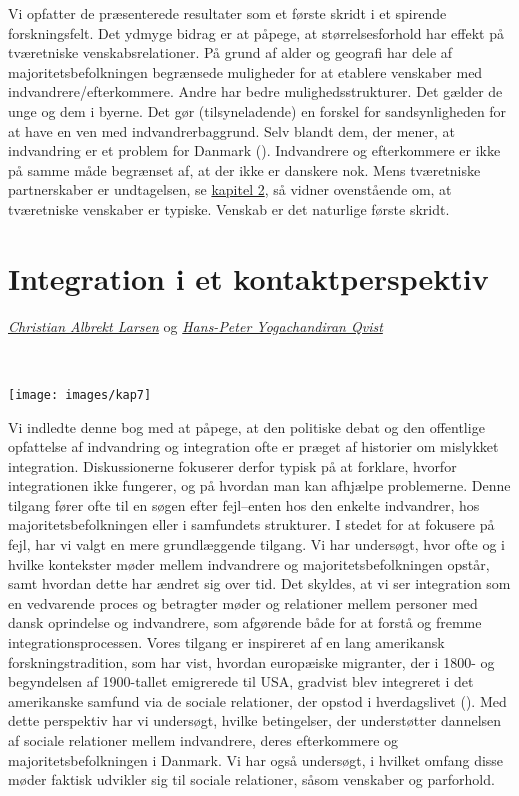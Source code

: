 \documentclass[
]{book}
\begin{document}
Vi opfatter de præsenterede resultater som et første skridt i et spirende forskningsfelt. Det ydmyge bidrag er at påpege, at størrelsesforhold har effekt på tværetniske venskabsrelationer. På grund af alder og geografi har dele af majoritetsbefolkningen begrænsede muligheder for at etablere venskaber med indvandrere/efterkommere. Andre har bedre mulighedsstrukturer. Det gælder de unge og dem i byerne. Det gør (tilsyneladende) en forskel for sandsynligheden for at have en ven med indvandrerbaggrund. Selv blandt dem, der mener, at indvandring er et problem for Danmark (). Indvandrere og efterkommere er ikke på samme måde begrænset af, at der ikke er danskere nok. Mens tværetniske partnerskaber er undtagelsen, se \hyperref[kap2]{kapitel 2}, så vidner ovenstående om, at tværetniske venskaber er typiske. Venskab er det naturlige første skridt.

\chapter{Integration i et kontaktperspektiv}\label{kap7}

\thispagestyle{empty}

\emph{\href{https://vbn.aau.dk/en/persons/albrekt}{Christian Albrekt Larsen}} og \emph{\href{https://vbn.aau.dk/en/persons/hpq}{Hans-Peter Yogachandiran Qvist}}

~~~~

\texttt{[image: images/kap7]}

\newpage

Vi indledte denne bog med at påpege, at den politiske debat og den offentlige opfattelse af indvandring og integration ofte er præget af historier om mislykket integration. Diskussionerne fokuserer derfor typisk på at forklare, hvorfor integrationen ikke fungerer, og på hvordan man kan afhjælpe problemerne. Denne tilgang fører ofte til en søgen efter fejl--enten hos den enkelte indvandrer, hos majoritetsbefolkningen eller i samfundets strukturer. I stedet for at fokusere på fejl, har vi valgt en mere grundlæggende tilgang. Vi har undersøgt, hvor ofte og i hvilke kontekster møder mellem indvandrere og majoritetsbefolkningen opstår, samt hvordan dette har ændret sig over tid. Det skyldes, at vi ser integration som en vedvarende proces og betragter møder og relationer mellem personer med dansk oprindelse og indvandrere, som afgørende både for at forstå og fremme integrationsprocessen. Vores tilgang er inspireret af en lang amerikansk forskningstradition, som har vist, hvordan europæiske migranter, der i 1800- og begyndelsen af 1900-tallet emigrerede til USA, gradvist blev integreret i det amerikanske samfund via de sociale relationer, der opstod i hverdagslivet (). Med dette perspektiv har vi undersøgt, hvilke betingelser, der understøtter dannelsen af sociale relationer mellem indvandrere, deres efterkommere og majoritetsbefolkningen i Danmark. Vi har også undersøgt, i hvilket omfang disse møder faktisk udvikler sig til sociale relationer, såsom venskaber og parforhold.
\end{document}
